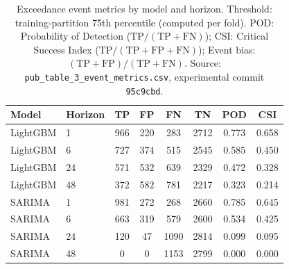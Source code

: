 \documentclass[12pt]{article}
\begin{document}
\pagestyle{empty}
\begin{table}[ht]
\centering
\caption{Exceedance event metrics by model and horizon.
Threshold: training-partition 75th percentile (computed per fold).
POD: Probability of Detection ($\mathrm{TP}/(\mathrm{TP}+\mathrm{FN})$);
CSI: Critical Success Index ($\mathrm{TP}/(\mathrm{TP}+\mathrm{FP}+\mathrm{FN})$);
Event bias: $(\mathrm{TP}+\mathrm{FP})/(\mathrm{TP}+\mathrm{FN})$.
Source: \texttt{pub\_table\_3\_event\_metrics.csv}, experimental commit
\texttt{95c9cbd}.}
\label{tab:event_metrics}
\begin{tabular}{llSSSSSS}
\toprule
Model & Horizon & TP & FP & FN & TN & {POD} & {CSI} \\
\midrule
LightGBM & 1  &  966 &  220 &  283 & 2712 & 0.773 & 0.658 \\
LightGBM & 6  &  727 &  374 &  515 & 2545 & 0.585 & 0.450 \\
LightGBM & 24 &  571 &  532 &  639 & 2329 & 0.472 & 0.328 \\
LightGBM & 48 &  372 &  582 &  781 & 2217 & 0.323 & 0.214 \\
\addlinespace
SARIMA   & 1  &  981 &  272 &  268 & 2660 & 0.785 & 0.645 \\
SARIMA   & 6  &  663 &  319 &  579 & 2600 & 0.534 & 0.425 \\
SARIMA   & 24 &  120 &   47 & 1090 & 2814 & 0.099 & 0.095 \\
SARIMA   & 48 &    0 &    0 & 1153 & 2799 & 0.000 & 0.000 \\
\bottomrule
\end{tabular}
\end{table}
\end{document}
